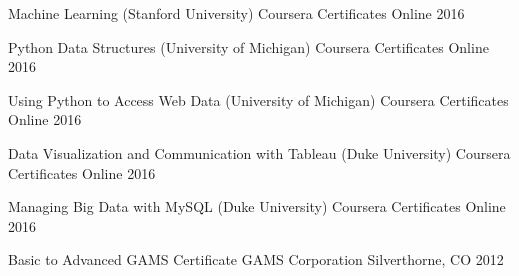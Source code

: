 

\begin{cvhonors}

    \cvhonor
    {Machine Learning (Stanford University)} %
    {Coursera Certificates} %
    {Online} %
    {2016} %

    \cvhonor
    {Python Data Structures (University of Michigan)} %
    {Coursera Certificates} %
    {Online} %
    {2016} %

    \cvhonor
    {Using Python to Access Web Data (University of Michigan)} %
    {Coursera Certificates} %
    {Online} %
    {2016} %

    \cvhonor
    {Data Visualization and Communication with Tableau (Duke University)} %
    {Coursera Certificates} %
    {Online} %
    {2016} %

    \cvhonor
    {Managing Big Data with MySQL (Duke University)} %
    {Coursera Certificates} %
    {Online} %
    {2016} %

    \cvhonor
    {Basic to Advanced GAMS Certificate} %
    {GAMS Corporation} %
    {Silverthorne, CO} %
    {2012} %

\end{cvhonors}
